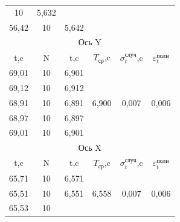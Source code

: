 \begin{table}[h!]
\begin{tabular}{|cccccc|}
  \multicolumn{1}{c|}{10} &
  \multicolumn{1}{c|}{5,632} &
  \multicolumn{1}{c|}{} &
  \multicolumn{1}{c|}{} &
   \\ \cline{1-3}
\multicolumn{1}{|c|}{56,42} &
  \multicolumn{1}{c|}{10} &
  \multicolumn{1}{c|}{5,642} &
  \multicolumn{1}{c|}{} &
  \multicolumn{1}{c|}{} &
   \\ \hline
\multicolumn{6}{|c|}{Ось Y} \\ \hline
\multicolumn{1}{|c|}{t,c} &
  \multicolumn{1}{c|}{N} &
  \multicolumn{1}{c|}{t,c} &
  \multicolumn{1}{c|}{$T_\text{ср}$,c} &
  \multicolumn{1}{c|}{$\sigma_t^\text{случ}$,c} &
  $\varepsilon_t^\text{полн}$ \\ \hline
\multicolumn{1}{|c|}{69,01} &
  \multicolumn{1}{c|}{10} &
  \multicolumn{1}{c|}{6,901} &
  \multicolumn{1}{c|}{\multirow{5}{*}{6,900}} &
  \multicolumn{1}{c|}{\multirow{5}{*}{0,007}} &
  \multirow{5}{*}{0,006} \\ \cline{1-3}
\multicolumn{1}{|c|}{69,12} &
  \multicolumn{1}{c|}{10} &
  \multicolumn{1}{c|}{6,912} &
  \multicolumn{1}{c|}{} &
  \multicolumn{1}{c|}{} &
   \\ \cline{1-3}
\multicolumn{1}{|c|}{68,91} &
  \multicolumn{1}{c|}{10} &
  \multicolumn{1}{c|}{6,891} &
  \multicolumn{1}{c|}{} &
  \multicolumn{1}{c|}{} &
   \\ \cline{1-3}
\multicolumn{1}{|c|}{68,97} &
  \multicolumn{1}{c|}{10} &
  \multicolumn{1}{c|}{6,897} &
  \multicolumn{1}{c|}{} &
  \multicolumn{1}{c|}{} &
   \\ \cline{1-3}
\multicolumn{1}{|c|}{69,01} &
  \multicolumn{1}{c|}{10} &
  \multicolumn{1}{c|}{6,901} &
  \multicolumn{1}{c|}{} &
  \multicolumn{1}{c|}{} &
   \\ \hline
\multicolumn{6}{|c|}{Ось X} \\ \hline
\multicolumn{1}{|c|}{t,c} &
  \multicolumn{1}{c|}{N} &
  \multicolumn{1}{c|}{t,c} &
  \multicolumn{1}{c|}{$T_\text{ср}$,c} &
  \multicolumn{1}{c|}{$\sigma_t^\text{случ}$,c} &
  $\varepsilon_t^\text{полн}$ \\ \hline
\multicolumn{1}{|c|}{65,71} &
  \multicolumn{1}{c|}{10} &
  \multicolumn{1}{c|}{6,571} &
  \multicolumn{1}{c|}{\multirow{5}{*}{6,558}} &
  \multicolumn{1}{c|}{\multirow{5}{*}{0,007}} &
  \multirow{5}{*}{0,006} \\ \cline{1-3}
\multicolumn{1}{|c|}{65,51} &
  \multicolumn{1}{c|}{10} &
  \multicolumn{1}{c|}{6,551} &
  \multicolumn{1}{c|}{} &
  \multicolumn{1}{c|}{} &
   \\ \cline{1-3}
\multicolumn{1}{|c|}{65,53} &
  \multicolumn{1}{c|}{10} &

\end{tabular}
\end{table}

